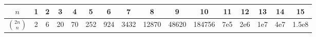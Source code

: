 \begin{center}
\begin{tabular}{c|c@{\ }c@{\ }c@{\ }c@{\ }c@{\ }c@{\ }c@{\ }c@{\ }c@{\ }c@{\ }c@{\ }c@{\ }c@{\ }c@{\ }c}
$n$             & 1 & 2 & 3  & 4  & 5   & 6   & 7    & 8     & 9     & 10     & 11     & 12      & 13       & 14       & 15\\
\hline
  $\binom{2n}{n}$ & 2 & 6 & 20 & 70 & 252 & 924 & 3432 & 12870 & 48620 & 184756 & 7e5 & 2e6 & 1e7 & 4e7 & 1.5e8 \\
\end{tabular}\\
\end{center}
